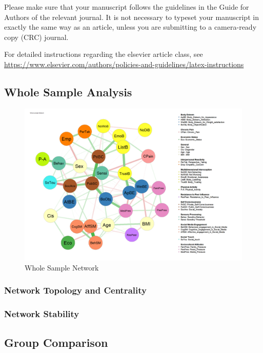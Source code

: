 \documentclass[preprint, 3p,
authoryear]{elsarticle} %
\begin{document}
Please make sure that your manuscript follows the guidelines in the
Guide for Authors of the relevant journal. It is not necessary to
typeset your manuscript in exactly the same way as an article, unless
you are submitting to a camera-ready copy (CRC) journal.

For detailed instructions regarding the elsevier article class, see
\url{https://www.elsevier.com/authors/policies-and-guidelines/latex-instructions}

\hypertarget{whole-sample-analysis}{%
\subsection{Whole Sample Analysis}\label{whole-sample-analysis}}

\begin{figure}[H]

{\centering \includegraphics[width=1\linewidth,]{../Figures_Quest/Network_Whole_imputed} 

}

\caption{\label{Whole Sample} Whole Sample Network}\label{fig:unnamed-chunk-3}
\end{figure}

\hypertarget{network-topology-and-centrality}{%
\subsubsection{Network Topology and
Centrality}\label{network-topology-and-centrality}}

\hypertarget{network-stability}{%
\subsubsection{Network Stability}\label{network-stability}}

\hypertarget{group-comparison}{%
\subsection{Group Comparison}\label{group-comparison}}

\renewcommand\refname{References}

\end{document}
